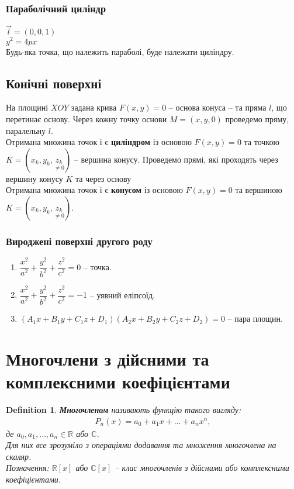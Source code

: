 \documentclass[a4paper, 10pt]{extarticle}
\theoremstyle{theoremdd}
\theoremstyle{theoremdd}
\newtheorem{definition}[theorem]{Definition}
\theoremstyle{theoremdd}
\theoremstyle{theoremdd}
\theoremstyle{theoremdd}
\theoremstyle{theoremdd}
\theoremstyle{theoremdd}
\theoremstyle{theoremdd}
\begin{document}
\subsubsection{Параболічний циліндр}
$\vec{l} = (0,0,1)$\\
$y^2 = 4px$\\
Будь-яка точка, що належить параболі, буде належати циліндру.

\subsection{Конічні поверхні}
На площині $XOY$ задана крива $F(x,y) = 0$ -- основа конуса -- та пряма $l$, що перетинає основу. Через кожну точку основи $M = (x,y,0)$ проведемо пряму, паралельну $l$.\\
Отримана множина точок і є \textbf{циліндром} із основою $F(x,y) = 0$ та точкою $K = (x_k, y_k, \underset{\neq 0}{z_k})$ -- вершина конусу. Проведемо прямі, які проходять через вершину конусу $K$ та через основу\\
Отримана множина точок і є \textbf{конусом} із основою $F(x,y) = 0$ та вершиною $K = (x_k, y_k, \underset{\neq 0}{z_k})$.

\subsubsection*{Вироджені поверхні другого роду}
\begin{enumerate}[nosep,wide=0pt,label={\Roman*.}]
\item $\dfrac{x^2}{a^2} + \dfrac{y^2}{b^2} + \dfrac{z^2}{c^2} = 0$ -- точка.
\item $\dfrac{x^2}{a^2} + \dfrac{y^2}{b^2} + \dfrac{z^2}{c^2} = -1$ -- уявний еліпсоїд.
\item $(A_1 x + B_1 y + C_1 z + D_1)(A_2 x + B_2 y + C_2 z + D_2) = 0$ -- пара площин.
\end{enumerate}
\newpage

\section{Многочлени з дійсними та комплексними коефіцієнтами}
\begin{definition}
\textbf{Многочленом} називають функцію такого вигляду:
\begin{align*}
P_n(x) = a_0 + a_1 x + \dots + a_n x^n,
\end{align*}
де $a_0,a_1,\dots,a_n \in \mathbb{R}$ або $\mathbb{C}$.\\
Для них все зрозуміло з операціями додавання та множення многочлена на скаляр.\\
Позначення: $\mathbb{R}[x]$ або $\mathbb{C}[x]$ -- клас многочленів з дійсними або комплексними коефіцієнтами.
\end{definition}
\end{document}
